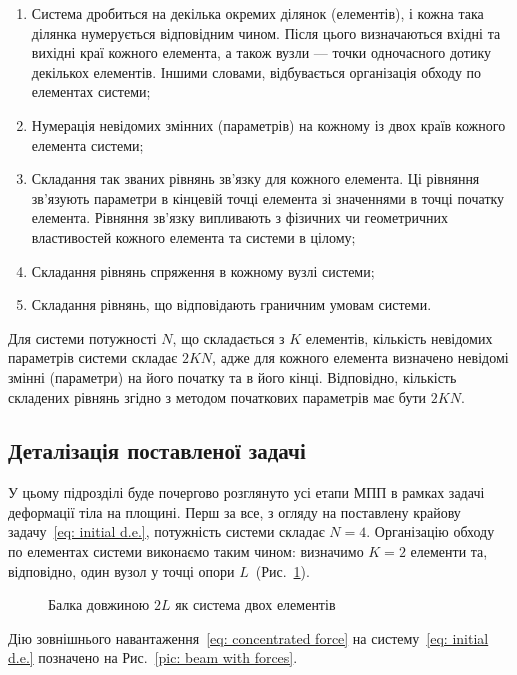 \documentclass{mathreport}
\begin{document}
\begin{enumerate}
    \item Система дробиться на декілька окремих ділянок (елементів), і кожна така ділянка нумерується відповідним чином. Після цього визначаються вхідні та вихідні краї кожного елемента, а також вузли --- точки одночасного дотику декількох елементів. Іншими словами, відбувається організація обходу по елементах системи;
    \item Нумерація невідомих змінних (параметрів) на кожному із двох країв кожного елемента системи;
    \item Складання так званих рівнянь зв’язку для кожного елемента. Ці рівняння зв’язують параметри в кінцевій точці елемента зі значеннями в точці початку елемента. Рівняння зв'язку випливають з фізичних чи геометричних властивостей кожного елемента та системи в цілому;
    \item Складання рівнянь спряження в кожному вузлі системи;
    \item Складання рівнянь, що відповідають граничним умовам системи.
\end{enumerate}

Для системи потужності $N$, що складається з $K$ елементів, кількість невідомих параметрів системи складає $2KN$, адже для кожного елемента визначено невідомі змінні (параметри) на його початку та в його кінці. Відповідно, кількість складених рівнянь згідно з методом початкових параметрів має бути $2KN$.  

\newpage
\subsection*{Деталізація поставленої задачі}

У цьому підрозділі буде почергово розглянуто усі етапи МПП в рамках задачі деформації тіла на площині. Перш за все, з огляду на поставлену крайову задачу~\eqref{eq: initial d.e.}, потужність системи складає $N=4$. Організацію обходу по елементах системи виконаємо таким чином: визначимо $K=2$ елементи та, відповідно, один вузол у точці опори $L$~(Рис.~\ref{pic: beam}).

\vspace{1cm}
\begin{figure}[H]\centering
    
    \caption{Балка довжиною $2L$ як система двох елементів}
    \label{pic: beam}
\end{figure}

Дію зовнішнього навантаження~\eqref{eq: concentrated force} на систему~\eqref{eq: initial d.e.} позначено на Рис.~\ref{pic: beam with forces}.
\end{document}
